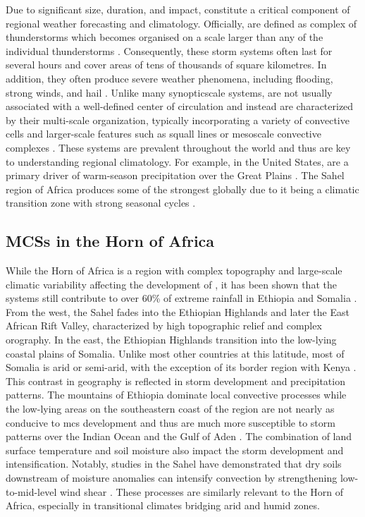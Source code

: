 Due to significant size, duration, and impact,  constitute a critical component of regional weather forecasting and climatology. Officially,  are defined as complex of thunderstorms which becomes organised on a scale larger than any of the individual thunderstorms \citep{NOAANWS2025}. Consequently, these storm systems often last for several hours and cover areas of tens of thousands of square kilometres. In addition, they often produce severe weather phenomena, including flooding, strong winds, and hail \citep{Houze2014}. Unlike many \Gls{synopticscale} systems,  are not usually associated with a well-defined center of circulation and instead are characterized by their multi-scale organization, typically incorporating a variety of convective cells and larger-scale features such as squall lines or mesoscale convective complexes \citep{NOAANWS2025,AMS2024}. These systems are prevalent throughout the world and thus are key to understanding regional climatology. For example, in the United States,  are a primary driver of warm-season precipitation over the Great Plains \citep{Haberlie2019}. The Sahel region of Africa produces some of the strongest  globally due to it being a climatic transition zone with strong seasonal cycles \citep{Zipser2006}.

\subsection{MCSs in the Horn of Africa}

While the Horn of Africa is a region with complex topography and large-scale climatic variability affecting the development of , it has been shown that the systems still contribute to over 60\% of extreme rainfall in Ethiopia and Somalia \citep{Hill2023}. From the west, the Sahel fades into the Ethiopian Highlands and later the East African Rift Valley, characterized by high topographic relief and complex orography. In the east, the Ethiopian Highlands transition into the low-lying coastal plains of Somalia. Unlike most other countries at this latitude, most of Somalia is arid or semi-arid, with the exception of its border region with Kenya \citep{Beck2023}. This contrast in geography is reflected in storm development and precipitation patterns. The mountains of Ethiopia dominate local convective processes \citep{Negash2024} while the low-lying areas on the southeastern coast of the region are not nearly as conducive to \acrshort{mcs} development and thus are much more susceptible to storm patterns over the Indian Ocean and the Gulf of Aden \citep{Camberlin2024}. The combination of land surface temperature and soil moisture also impact the storm development and intensification. Notably, studies in the Sahel have demonstrated that dry soils downstream of moisture anomalies can intensify convection by strengthening low-to-mid-level wind shear \citep{Klein2021,Taylor2017}. These processes are similarly relevant to the Horn of Africa, especially in transitional climates bridging arid and humid zones.

